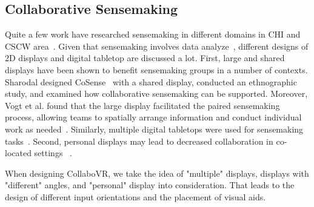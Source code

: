 \documentclass{sigchi}
\begin{document}
\subsection{Collaborative Sensemaking}
Quite a few work have researched sensemaking in different domains in CHI and CSCW area~\cite{albolino2007sensemaking, billman2007medical, landgren2007study,paul2009understanding}. Given that sensemaking involves data analyze~\cite{yi2008understanding}, different designs of 2D displays and digital tabletop are discussed a lot. First, large and shared displays have been shown to benefit sensemaking groups in a number of contexts. Sharodal designed CoSense~\cite{dervin1992mind} with a shared display, conducted an ethnographic study, and examined how collaborative sensemaking can be supported. Moreover, Vogt et al. found that the large display facilitated the paired sensemaking process, allowing teams to spatially arrange information and conduct individual work as needed~\cite{vogt2011co}. Similarly, multiple digital tabletops were used for sensemaking tasks~\cite{isenberg2010exploratory,morris2010wesearch}. Second, personal displays may lead to decreased collaboration in co-located settings ~\cite{chung2013investigating, wallace2009investigating}.

When designing CollaboVR, we take the idea of "multiple" displays, displays with "different" angles, and "personal" display into consideration. That leads to the design of different input orientations and the placement of visual aids.
\end{document}
